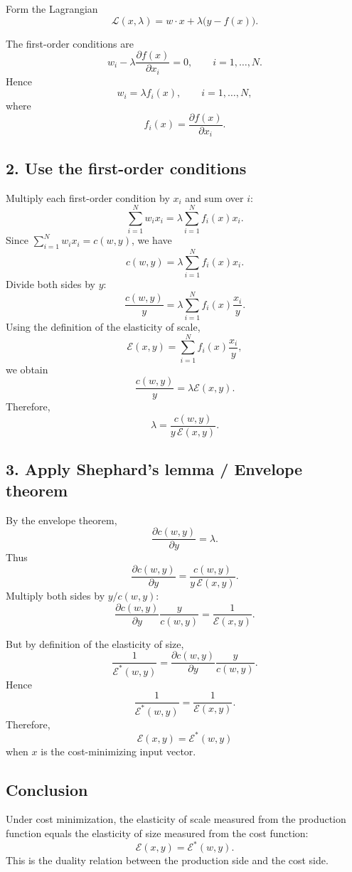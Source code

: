 Form the Lagrangian
\[
\mathcal L(x,\lambda)=w\cdot x+\lambda\bigl(y-f(x)\bigr).
\]

The first-order conditions are
\[
w_i-\lambda \frac{\partial f(x)}{\partial x_i}=0,
\qquad i=1,\dots,N.
\]
Hence
\[
w_i=\lambda f_i(x),
\qquad i=1,\dots,N,
\]
where
\[
f_i(x)=\frac{\partial f(x)}{\partial x_i}.
\]

\subsection*{2. Use the first-order conditions}

Multiply each first-order condition by \(x_i\) and sum over \(i\):
\[
\sum_{i=1}^N w_i x_i
=
\lambda \sum_{i=1}^N f_i(x)x_i.
\]
Since \(\sum_{i=1}^N w_i x_i = c(w,y)\), we have
\[
c(w,y)=\lambda \sum_{i=1}^N f_i(x)x_i.
\]
Divide both sides by \(y\):
\[
\frac{c(w,y)}{y}
=
\lambda \sum_{i=1}^N f_i(x)\frac{x_i}{y}.
\]
Using the definition of the elasticity of scale,
\[
\mathcal E(x,y)=\sum_{i=1}^N f_i(x)\frac{x_i}{y},
\]
we obtain
\[
\frac{c(w,y)}{y}=\lambda \mathcal E(x,y).
\]
Therefore,
\[
\lambda=\frac{c(w,y)}{y\,\mathcal E(x,y)}.
\]

\subsection*{3. Apply Shephard's lemma / Envelope theorem}

By the envelope theorem,
\[
\frac{\partial c(w,y)}{\partial y}=\lambda.
\]
Thus
\[
\frac{\partial c(w,y)}{\partial y}
=
\frac{c(w,y)}{y\,\mathcal E(x,y)}.
\]
Multiply both sides by \(y/c(w,y)\):
\[
\frac{\partial c(w,y)}{\partial y}\frac{y}{c(w,y)}
=
\frac{1}{\mathcal E(x,y)}.
\]

But by definition of the elasticity of size,
\[
\frac{1}{\mathcal E^*(w,y)}
=
\frac{\partial c(w,y)}{\partial y}\frac{y}{c(w,y)}.
\]
Hence
\[
\frac{1}{\mathcal E^*(w,y)}=\frac{1}{\mathcal E(x,y)}.
\]
Therefore,
\[
\boxed{
\mathcal E(x,y)=\mathcal E^*(w,y)
}
\]
when \(x\) is the cost-minimizing input vector.

\subsection*{Conclusion}

Under cost minimization, the elasticity of scale measured from the production function equals the elasticity of size measured from the cost function:
\[
\boxed{
\mathcal E(x,y)=\mathcal E^*(w,y).
}
\]
This is the duality relation between the production side and the cost side.



